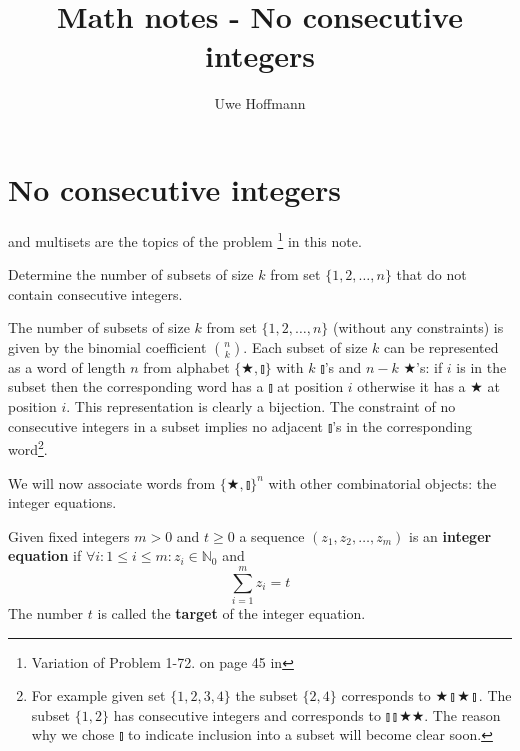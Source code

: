 

\title{Math notes - No consecutive integers}
\author{Uwe Hoffmann}



\setcounter{chapter}{1}
\section*{No consecutive integers}

 and multisets are the topics of the problem \footnote{Variation of Problem 1-72. on page 45 in } in this note.

\vspace{10 mm}
\begin{problem}
Determine the number of subsets of size $k$ from set $\{1, 2, \ldots, n\}$ that do not contain consecutive integers.
\end{problem}

The number of subsets of size $k$ from set $\{1, 2, \ldots, n\}$ (without any constraints) is given by the binomial coefficient $\binom{n}{k}$. Each subset of size $k$ can be represented as a word of length $n$ from alphabet $\{\bigstar, \talloblong\}$ with $k$ $\talloblong$'s and $n-k$ $\bigstar$'s: if $i$ is in the subset then the corresponding word has a $\talloblong$ at position $i$ otherwise it has a $\bigstar$ at position $i$. This representation is clearly a bijection. The constraint of no consecutive integers in a subset implies no adjacent $\talloblong$'s in the corresponding word\footnote{For example given set $\{1, 2, 3, 4\}$ the subset $\{2, 4\}$ corresponds to $\bigstar\talloblong\bigstar\talloblong$. The subset $\{1, 2\}$ has consecutive integers and corresponds to $\talloblong\talloblong\bigstar\bigstar$. The reason why we chose $\talloblong$ to indicate inclusion into a subset will become clear soon.}.

We will now associate words from $\{\bigstar, \talloblong\}^n$ with other combinatorial objects: the integer equations.

\begin{defn}
Given fixed integers $m > 0$ and $t \geq 0$ a sequence $(z_1, z_2, \ldots, z_m)$ is an \textbf{integer equation} if $\forall i: 1 \leq i \leq m: z_i \in \mathbb{N}_0$ and
$$
\sum_{i = 1}^m z_i = t
$$
The number $t$ is called the \textbf{target}	of the integer equation.
\end{defn}

